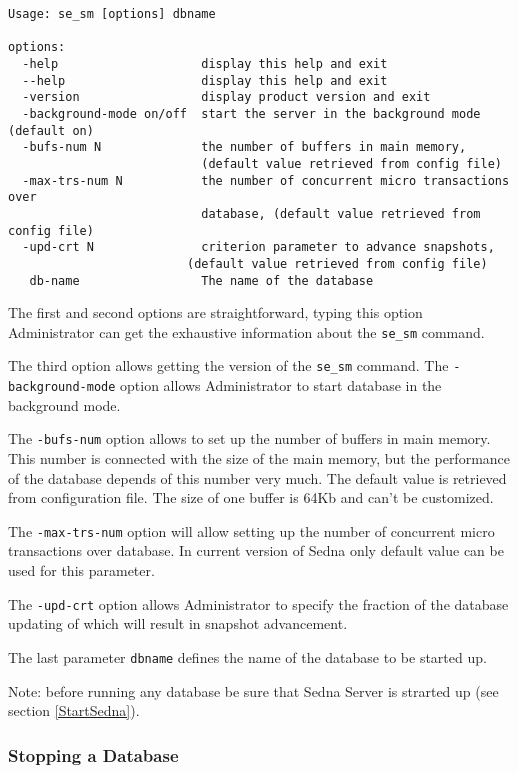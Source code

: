 \documentclass[a4paper,12pt]{article}
\begin{document}
\begin{verbatim}
Usage: se_sm [options] dbname

options:
  -help                    display this help and exit
  --help                   display this help and exit
  -version                 display product version and exit
  -background-mode on/off  start the server in the background mode (default on)
  -bufs-num N              the number of buffers in main memory,
                           (default value retrieved from config file)
  -max-trs-num N           the number of concurrent micro transactions over
                           database, (default value retrieved from config file)
  -upd-crt N               criterion parameter to advance snapshots,
                         (default value retrieved from config file)
   db-name                 The name of the database
\end{verbatim}

The first and second options are straightforward, typing this option Administrator can get the exhaustive information about the \verb!se_sm! command.

The third option allows getting the version of the \verb!se_sm! command.
The \verb!-background-mode! option allows Administrator to start database in the background mode.

The \verb!-bufs-num! option allows to set up the number of buffers in main memory. This number is connected with the size of the main memory, but the performance of the database depends of this number very much. The default value is retrieved from configuration file. The size of one buffer is 64Kb and can't be customized.

The \verb!-max-trs-num! option will allow setting up the number of concurrent micro transactions over database. In current version of Sedna only default value can be used for this parameter.

The \verb!-upd-crt! option allows Administrator to specify the fraction of the database updating of which will result in snapshot advancement.

The last parameter \verb!dbname!  defines the name of the database to be started up. 


Note: before running any database be sure that Sedna Server is strarted up (see section \ref{StartSedna}).

\subsubsection{Stopping a Database}
\label{StopDB}
\end{document}
